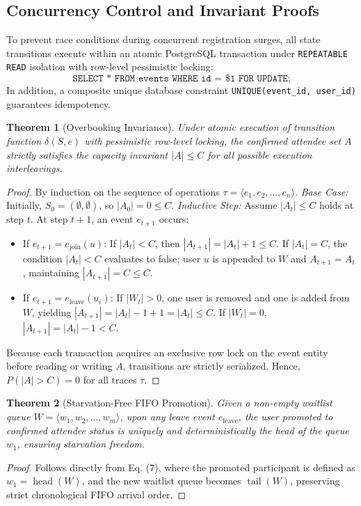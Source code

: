\documentclass[conference]{IEEEtran}
\newtheorem{theorem}{Theorem}
\begin{document}
\subsection{Concurrency Control and Invariant Proofs}
To prevent race conditions during concurrent registration surges, all state transitions execute within an atomic PostgreSQL transaction under \texttt{REPEATABLE READ} isolation with row-level pessimistic locking:
\begin{equation}
\texttt{SELECT * FROM events WHERE id = \$1 FOR UPDATE;}
\end{equation}
In addition, a composite unique database constraint \texttt{UNIQUE(event\_id, user\_id)} guarantees idempotency.

\begin{theorem}[Overbooking Invariance]
Under atomic execution of transition function $\delta(S, e)$ with pessimistic row-level locking, the confirmed attendee set $A$ strictly satisfies the capacity invariant $|A| \le C$ for all possible execution interleavings.
\end{theorem}
\begin{proof}
By induction on the sequence of operations $\tau = \langle e_1, e_2, \dots, e_n \rangle$.
\textit{Base Case:} Initially, $S_0 = (\emptyset, \emptyset)$, so $|A_0| = 0 \le C$.
\textit{Inductive Step:} Assume $|A_t| \le C$ holds at step $t$. At step $t+1$, an event $e_{t+1}$ occurs:
\begin{itemize}
    \item If $e_{t+1} = e_{\text{join}}(u)$: If $|A_t| < C$, then $|A_{t+1}| = |A_t| + 1 \le C$. If $|A_t| = C$, the condition $|A_t| < C$ evaluates to false; user $u$ is appended to $W$ and $A_{t+1} = A_t$, maintaining $|A_{t+1}| = C \le C$.
    \item If $e_{t+1} = e_{\text{leave}}(u_i)$: If $|W_t| > 0$, one user is removed and one is added from $W$, yielding $|A_{t+1}| = |A_t| - 1 + 1 = |A_t| \le C$. If $|W_t| = 0$, $|A_{t+1}| = |A_t| - 1 < C$.
\end{itemize}
Because each transaction acquires an exclusive row lock on the event entity before reading or writing $A$, transitions are strictly serialized. Hence, $P(|A| > C) = 0$ for all traces $\tau$.
\end{proof}

\begin{theorem}[Starvation-Free FIFO Promotion]
Given a non-empty waitlist queue $W = \langle w_1, w_2, \dots, w_m \rangle$, upon any leave event $e_{\text{leave}}$, the user promoted to confirmed attendee status is uniquely and deterministically the head of the queue $w_1$, ensuring starvation freedom.
\end{theorem}
\begin{proof}
Follows directly from Eq. (7), where the promoted participant is defined as $w_1 = \operatorname{head}(W)$, and the new waitlist queue becomes $\operatorname{tail}(W)$, preserving strict chronological FIFO arrival order.
\end{proof}
\end{document}
